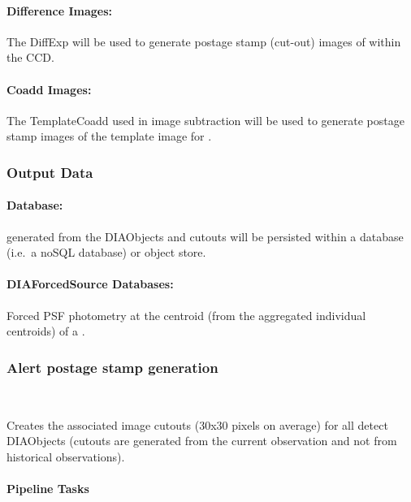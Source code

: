 \paragraph{Difference Images:} The DiffExp will be used to  generate postage stamp (cut-out) images of \DIASources within the CCD. 

\paragraph{Coadd Images:} The TemplateCoadd used in image subtraction will be used to  generate postage stamp images of the template image for \DIAObjects.


\subsubsection{Output Data}

\paragraph{\VOEvent Database:} \VOEvents generated from the DIAObjects and cutouts will be persisted within a database (i.e.\ a noSQL database) or object store. 

\paragraph*{DIAForcedSource Databases:} Forced PSF photometry at the centroid (from the aggregated individual \DIASource centroids) of a \DIAObject.



\subsubsection{Alert postage stamp generation}~

Creates the associated image cutouts (30x30 pixels on average) for all detect DIAObjects (cutouts are generated from the current observation and not from historical observations).

\paragraph{Pipeline Tasks}

